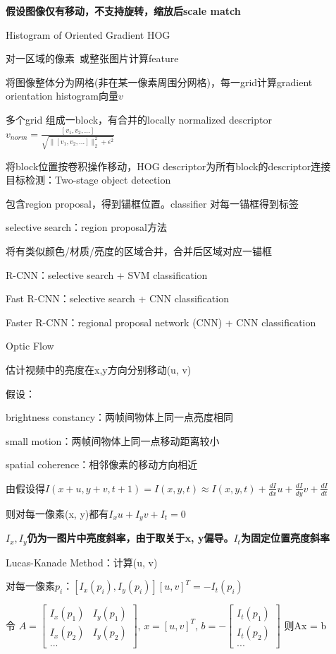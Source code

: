 \documentclass[UTF8]{ctexart}
\begin{document}
  \quad \textbf{假设图像仅有移动，不支持旋转，缩放后scale match}
  
  Histogram of Oriented Gradient HOG 

  \quad 对一区域的像素\ 或整张图片计算feature

  \quad 将图像整体分为网格(非在某一像素周围分网格)，每一grid计算gradient orientation histogram向量$v$

  \quad 多个grid 组成一block，有合并的locally normalized descriptor$v_{norm} = \frac{[v_1, v_2, ...]}{\sqrt{\|[v_1, v_2, ...]\|_2^2 + \epsilon^2}}$

  \quad 将block位置按卷积操作移动，HOG descriptor为所有block的descriptor连接\\
目标检测：Two-stage object detection

  包含region proposal，得到锚框位置。classifier 对每一锚框得到标签

  selective search：region proposal方法

  \quad 将有类似颜色/材质/亮度的区域合并，合并后区域对应一锚框

  R-CNN：selective search + SVM classification 

  Fast R-CNN：selective search + CNN classification

  Faster R-CNN：regional proposal network (CNN) + CNN classification


Optic Flow

  估计视频中的亮度在x,y方向分别移动(u, v)

  假设：

  \quad brightness constancy：两帧间物体上同一点亮度相同

  \quad small motion：两帧间物体上同一点移动距离较小

  \quad spatial coherence：相邻像素的移动方向相近
  
  由假设得$I(x + u, y + v, t + 1) = I(x, y, t) \approx I(x, y, t) + \frac{dI}{dx}u + \frac{dI}{dy}v + \frac{dI}{dt}$

  \quad 则对每一像素(x, y)都有$I_xu + I_yv + I_t = 0$

  \quad \textbf{$I_x, I_y$仍为一图片中亮度斜率，由于取关于x, y偏导。$I_t$为固定位置亮度斜率}

  Lucas-Kanade Method：计算(u, v)

  \quad 对每一像素$p_i$：$[I_x(p_i), I_y(p_i)][u, v]^T = -I_t(p_i)$

  \quad 令
    $A = 
    \begin{bmatrix}
      I_x(p_1) & I_y(p_1) \\ 
      I_x(p_2) & I_y(p_2) \\ 
      ...
      \end{bmatrix}$, 
    $x = [u, v]^T$,
    $b = -
    \begin{bmatrix}
      I_t(p_1) \\ 
      I_t(p_2) \\ 
      ...
      \end{bmatrix}$
    则Ax = b
\end{document}
